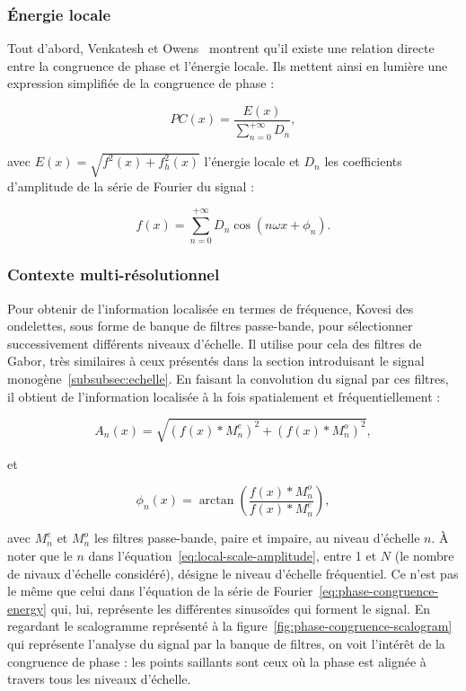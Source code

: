 \subsubsection{Énergie locale}

Tout d'abord, Venkatesh et Owens~\cite{venkatesh_energy_1989} montrent qu'il existe une relation directe entre la congruence de phase et l'énergie locale. Ils mettent ainsi en lumière une expression simplifiée de la congruence de phase :

\begin{equation}
    PC(x) = \frac{E(x)}{\sum_{n=0}^{+\infty} D_n},
\end{equation}

avec $E(x) = \sqrt{f^2(x) + f_h^2(x)}$ l'énergie locale et $D_n$ les coefficients d'amplitude de la série de Fourier du signal :

\begin{equation}
    f(x) = \sum_{n=0}^{+\infty} D_n\cos(n\omega x + \phi_n).
    \label{eq:phase-congruence-energy}
\end{equation}


\subsubsection{Contexte multi-résolutionnel}

Pour obtenir de l'information localisée en termes de fréquence, Kovesi des ondelettes, sous forme de banque de filtres passe-bande, pour sélectionner successivement différents niveaux d'échelle. Il utilise pour cela des filtres de Gabor, très similaires à ceux présentés dans la section introduisant le signal monogène~\ref{subsubsec:echelle}. En faisant la convolution du signal par ces filtres, il obtient de l'information localisée à la fois spatialement et fréquentiellement :

\begin{equation}
    A_n(x) = \sqrt{(f(x)*M^e_n)^2 + (f(x)*M^o_n)^2},
    \label{eq:local-scale-amplitude}
\end{equation}

et

\begin{equation}
    \phi_n(x) = \arctan\left(\frac{f(x)*M^o_n}{f(x)*M^e_n}\right),
\end{equation}

avec $M^e_n$ et $M^o_n$ les filtres passe-bande, paire et impaire, au niveau d'échelle $n$. À noter que le $n$ dans l'équation~\ref{eq:local-scale-amplitude}, entre 1 et $N$ (le nombre de nivaux d'échelle considéré), désigne le niveau d'échelle fréquentiel. Ce n'est pas le même que celui dans l'équation de la série de Fourier~\ref{eq:phase-congruence-energy} qui, lui, représente les différentes sinusoïdes qui forment le signal. En regardant le scalogramme représenté à la figure~\ref{fig:phase-congruence-scalogram} qui représente l'analyse du signal par la banque de filtres, on voit l'intérêt de la congruence de phase : les points saillants sont ceux où la phase est alignée à travers tous les niveaux d'échelle.

